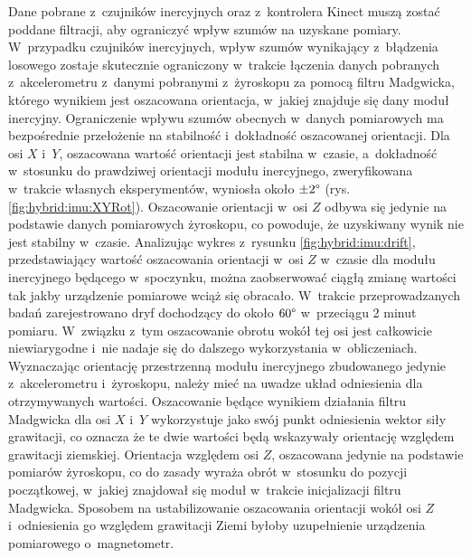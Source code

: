 Dane pobrane z~czujników inercyjnych oraz z~kontrolera Kinect muszą zostać poddane filtracji, aby ograniczyć wpływ szumów na uzyskane pomiary. W~przypadku czujników inercyjnych, wpływ szumów wynikający z~błądzenia losowego zostaje skutecznie ograniczony w~trakcie łączenia danych pobranych z~akcelerometru z~danymi pobranymi z~żyroskopu za pomocą filtru Madgwicka, którego wynikiem jest oszacowana orientacja, w~jakiej znajduje się dany moduł inercyjny. Ograniczenie wpływu szumów obecnych w~danych pomiarowych ma bezpośrednie przełożenie na stabilność i~dokładność oszacowanej orientacji. Dla osi $X$ i~$Y$, oszacowana wartość orientacji jest stabilna w~czasie, a~dokładność w~stosunku do prawdziwej orientacji modułu inercyjnego, zweryfikowana w~trakcie własnych eksperymentów, wyniosła około $\pm 2\degree$ (rys. \ref{fig:hybrid:imu:XYRot}).
Oszacowanie orientacji w~osi $Z$ odbywa się jedynie na podstawie danych pomiarowych żyroskopu, co powoduje, że uzyskiwany wynik nie jest stabilny w~czasie. Analizując wykres z~rysunku \ref{fig:hybrid:imu:drift}, przedstawiający wartość oszacowania orientacji w~osi $Z$ w~czasie dla modułu inercyjnego będącego w~spoczynku, można zaobserwować ciągłą zmianę wartości tak jakby urządzenie pomiarowe wciąż się obracało. W~trakcie przeprowadzanych badań zarejestrowano dryf dochodzący do około $60\degree$ w~przeciągu 2 minut pomiaru. W~związku z~tym oszacowanie obrotu wokół tej osi jest całkowicie niewiarygodne i~nie nadaje się do dalszego wykorzystania w~obliczeniach. \\
Wyznaczając orientację przestrzenną modułu inercyjnego zbudowanego jedynie z~akcelerometru i~żyroskopu, należy mieć na uwadze układ odniesienia dla otrzymywanych wartości. Oszacowanie będące wynikiem działania filtru Madgwicka dla osi $X$ i~$Y$ wykorzystuje jako swój punkt odniesienia wektor siły grawitacji, co oznacza że te dwie wartości będą wskazywały orientację względem grawitacji ziemskiej. Orientacja względem osi $Z$, oszacowana jedynie na podstawie pomiarów żyroskopu, co do zasady wyraża obrót w~stosunku do pozycji początkowej, w~jakiej znajdował się moduł w~trakcie inicjalizacji filtru Madgwicka. Sposobem na ustabilizowanie oszacowania orientacji wokół osi $Z$ i~odniesienia go względem grawitacji Ziemi byłoby uzupełnienie urządzenia pomiarowego o~magnetometr. \\
		

